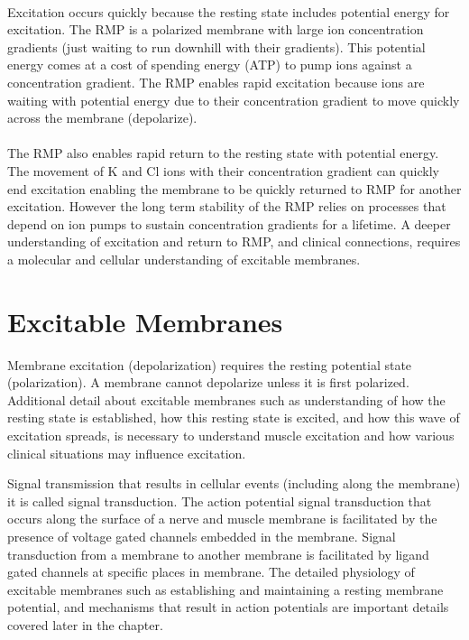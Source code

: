 \paragraph{}
Excitation occurs quickly because the resting state includes potential energy for excitation. The RMP is a polarized membrane with large ion concentration gradients (just waiting to run downhill with their gradients). This potential energy comes at a cost of spending energy (ATP) to pump ions against a concentration gradient. The RMP enables rapid excitation because ions are waiting with potential energy due to their concentration gradient to move quickly across the membrane (depolarize). 
\paragraph{}
The RMP also enables rapid return to the resting state with potential energy. The movement of K and Cl ions with their concentration gradient can quickly end excitation enabling the membrane to be quickly returned to RMP for another excitation. However the long term stability of the RMP relies on processes that depend on ion pumps to sustain concentration gradients for a lifetime.\footnotemark{}
A deeper understanding of excitation and return to RMP, and clinical connections, requires a molecular and cellular understanding of excitable membranes.



\section{Excitable Membranes}

Membrane excitation (depolarization) requires the resting potential state (polarization). A membrane cannot depolarize unless it is first polarized. Additional detail about excitable membranes such as understanding of how the resting state is established, how this resting state is excited, and how this wave of excitation spreads, is necessary to understand muscle excitation and how various clinical situations may influence excitation.

Signal transmission that results in cellular events (including along the membrane) it is called signal transduction. The action potential signal transduction that occurs along the surface of a nerve and muscle membrane is facilitated by the presence of voltage gated channels embedded in the membrane. Signal transduction from a membrane to another membrane is facilitated by ligand gated channels at specific places in membrane. The detailed physiology of excitable membranes such as establishing and maintaining a resting membrane potential, and mechanisms that result in action potentials are important details covered later in the chapter. 

